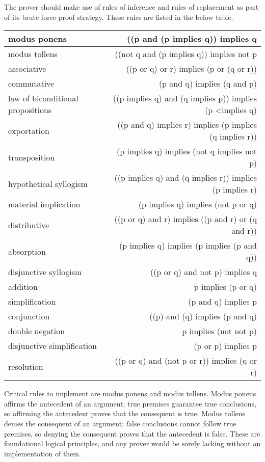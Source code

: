 \documentclass{l4proj}
\begin{document}
The prover should make use of rules of inference and rules of replacement as part of its brute force proof strategy. These rules are listed in the below table\cite{infrules}. 

\begin{tabular}{ l | r } 
\hline modus ponens & ((p and (p implies q)) implies q \\
\hline modus tollens & ((not q and (p implies q)) implies not p \\
\hline associative & ((p or q) or r) implies (p or (q or r)) \\
\hline commutative & (p and q) implies (q and p) \\
\hline law of biconditional propositions & ((p implies q) and (q implies p)) implies (p <implies q) \\
\hline exportation & ((p and q) implies r) implies (p implies (q implies r)) \\
\hline transposition & (p implies q) implies (not q implies not p) \\
\hline hypothetical syllogism & ((p implies q) and (q implies r)) implies (p implies r) \\
\hline material implication & (p implies q) implies (not p or q) \\
\hline distributive & ((p or q) and r) implies ((p and r) or (q and r)) \\
\hline absorption & (p implies q) implies (p implies (p and q)) \\
\hline disjunctive syllogism & ((p or q) and not p) implies q \\
\hline addition & p implies (p or q) \\
\hline simplification & (p and q) implies p \\
\hline conjunction & ((p) and (q) implies (p and q) \\
\hline double negation & p implies (not not p) \\
\hline disjunctive simplification & (p or p) implies p \\
\hline resolution & ((p or q) and (not p or r)) implies (q or r) \\
\hline
\end{tabular}

Critical rules to implement are modus ponens and modus tollens. Modus ponens affirms the antecedent of an argument; true premises guarantee true conclusions, so affirming the antecedent proves that the consequent is true. Modus tollens denies the consequent of an argument; false conclusions cannot follow true premises, so denying the consequent proves that the antecedent is false. These are foundational logical principles, and any prover would be sorely lacking without an implementation of them. 
\end{document}
